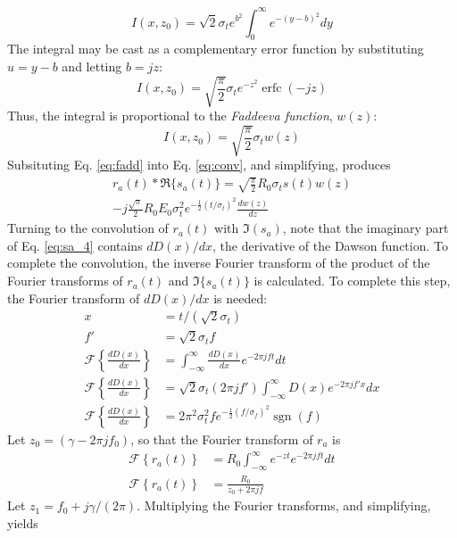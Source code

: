 \documentclass[amsmath,amssymb,aps,prd,10pt,twocolumn,showkeys]{revtex4}
\DeclareMathOperator\erfc{erfc}
\DeclareMathOperator{\sgn}{sgn}
\begin{document}
\begin{itemize}
\begin{equation}
I(x,z_0) = \sqrt{2}\sigma_t e^{b^2} \int_0^{\infty} e^{-(y-b)^2} dy
\end{equation}
The integral may be cast as a complementary error function by substituting $u=y-b$ and letting $b=jz$:
\begin{equation}
I(x,z_0) = \sqrt{\frac{\pi}{2}}\sigma_t e^{-z^2}\erfc(-jz)
\end{equation}
Thus, the integral is proportional to the \textit{Faddeeva function}, $w(z)$:
\begin{equation}
I(x,z_0) = \sqrt{\frac{\pi}{2}} \sigma_t w(z) \label{eq:fadd}
\end{equation}
Subsituting Eq. \ref{eq:fadd} into Eq. \ref{eq:conv}, and simplifying, produces
\begin{multline}
r_a(t) * \Re\lbrace s_a(t) \rbrace = \sqrt{\frac{\pi}{2}}R_0 \sigma_t s(t) w(z) \\
-j\frac{\sqrt{\pi}}{2} R_0 E_0 \sigma_t^2 e^{-\frac{1}{2}(t/\sigma_t)^2} \frac{dw(z)}{dz}
\end{multline}
Turning to the convolution of $r_a(t)$ with $\Im(s_a)$, note that the imaginary part of Eq. \ref{eq:sa_4} contains $dD(x)/dx$, the derivative of the Dawson function.  To complete the convolution, the inverse Fourier transform of the product of the Fourier transforms of $r_a(t)$ and $\Im\lbrace s_a(t)\rbrace$ is calculated.  To complete this step, the Fourier transform of $dD(x)/dx$ is needed:
\begin{align}
x &= t/(\sqrt{2}\sigma_t) \\
f' &= \sqrt{2} \sigma_t f \\
\mathcal{F}\left\lbrace \frac{dD(x)}{dx}\right\rbrace &= \int_{-\infty}^{\infty} \frac{dD(x)}{dx}e^{-2\pi jft} dt \\
\mathcal{F}\left\lbrace \frac{dD(x)}{dx}\right\rbrace &= \sqrt{2}\sigma_t(2\pi jf') \int_{-\infty}^{\infty} D(x) e^{-2\pi jf'x} dx \\
\mathcal{F}\left\lbrace \frac{dD(x)}{dx}\right\rbrace &= 2\pi^2 \sigma_t^2 f e^{-\frac{1}{2}(f/\sigma_f)^2} \sgn(f)
\end{align}
Let $z_0 = (\gamma - 2\pi jf_0)$, so that the Fourier transform of $r_a$ is 
\begin{align}
\mathcal{F}\left\lbrace r_a(t)\right\rbrace &= R_0\int_{-\infty}^{\infty} e^{-zt} e^{-2\pi j ft} dt \\
\mathcal{F}\left\lbrace r_a(t)\right\rbrace &= \frac{R_0}{z_0+2\pi j f}
\end{align}
Let $z_1 = f_0 + j\gamma/(2\pi)$. Multiplying the Fourier transforms, and simplifying, yields

\end{itemize}
\end{document}
